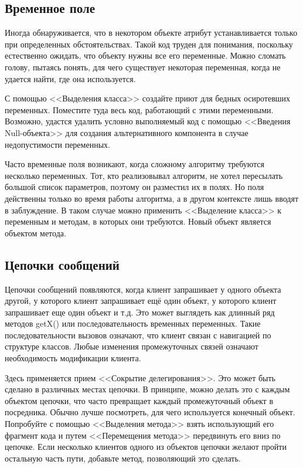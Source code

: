 \documentclass{../../text-style}
\begin{document}
\subsection{Временное поле}

Иногда обнаруживается, что в некотором объекте атрибут устанавливается только при определенных обстоятельствах. Такой код труден для понимания, поскольку естественно ожидать, что объекту нужны все его переменные. Можно сломать голову, пытаясь понять, для чего существует некоторая переменная, когда не удается найти, где она используется.

С помощью <<Выделения класса>> создайте приют для бедных осиротевших переменных. Поместите туда весь код, работающий с этими переменными. Возможно, удастся удалить условно выполняемый код с помощью <<Введения Null-объекта>> для создания альтернативного компонента в случае недопустимости переменных.

Часто временные поля возникают, когда сложному алгоритму требуются несколько переменных. Тот, кто реализовывал алгоритм, не хотел пересылать большой список параметров, поэтому он разместил их в полях. Но поля действенны только во время работы алгоритма, а в другом контексте лишь вводят в заблуждение. В таком случае можно применить <<Выделение класса>> к переменным и методам, в которых они требуются. Новый объект является объектом метода.

\subsection{Цепочки сообщений}

Цепочки сообщений появляются, когда клиент запрашивает у одного объекта другой, у которого клиент запрашивает ещё один объект, у которого клиент запрашивает еще один объект и т.д. Это может выглядеть как длинный ряд методов getX() или последовательность временных переменных. Такие последовательности вызовов означают, что клиент связан с навигацией по структуре классов. Любые изменения промежуточных связей означают необходимость модификации клиента.

Здесь применяется прием <<Сокрытие делегирования>>. Это может быть сделано в различных местах цепочки. В принципе, можно делать это с каждым объектом цепочки, что часто превращает каждый промежуточный объект в посредника. Обычно лучше посмотреть, для чего используется конечный объект. Попробуйте с помощью <<Выделения метода>> взять использующий его фрагмент кода и путем <<Перемещения метода>> передвинуть его вниз по цепочке. Если несколько клиентов одного из объектов цепочки желают пройти остальную часть пути, добавьте метод, позволяющий это сделать. 
\end{document}
